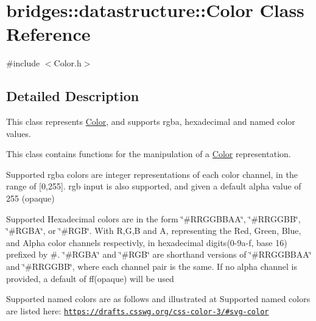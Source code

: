 \hypertarget{classbridges_1_1datastructure_1_1_color}{}\section{bridges\+:\+:datastructure\+:\+:Color Class Reference}
\label{classbridges_1_1datastructure_1_1_color}


{\ttfamily \#include $<$Color.\+h$>$}



\subsection{Detailed Description}
This class represents \hyperlink{classbridges_1_1datastructure_1_1_color}{Color}, and supports rgba, hexadecimal and named color values. 

This class contains functions for the manipulation of a \hyperlink{classbridges_1_1datastructure_1_1_color}{Color} representation.

Supported rgba colors are integer representations of each color channel, in the range of \mbox{[}0,255\mbox{]}. rgb input is also supported, and given a default alpha value of 255 (opaque)

Supported Hexadecimal colors are in the form \char`\"{}\#\+R\+R\+G\+G\+B\+B\+A\+A\char`\"{}, \char`\"{}\#\+R\+R\+G\+G\+B\+B\char`\"{}, \char`\"{}\#\+R\+G\+B\+A\char`\"{}, or \char`\"{}\#\+R\+G\+B\char`\"{}. With R,G,B and A, representing the Red, Green, Blue, and Alpha color channels respectivly, in hexadecimal digits(0-\/9a-\/f, base 16) prefixed by \textquotesingle{}\#\textquotesingle{}. \char`\"{}\#\+R\+G\+B\+A\char`\"{} and \char`\"{}\#\+R\+G\+B\char`\"{} are shorthand versions of \char`\"{}\#\+R\+R\+G\+G\+B\+B\+A\+A\char`\"{} and \char`\"{}\#\+R\+R\+G\+G\+B\+B\char`\"{}, where each channel pair is the same. If no alpha channel is provided, a default of \textquotesingle{}ff\textquotesingle{}(opaque) will be used

Supported named colors are as follows and illustrated at Supported named colors are listed here\+: \href{https://drafts.csswg.org/css-color-3/#svg-color}{\tt https\+://drafts.\+csswg.\+org/css-\/color-\/3/\#svg-\/color}

